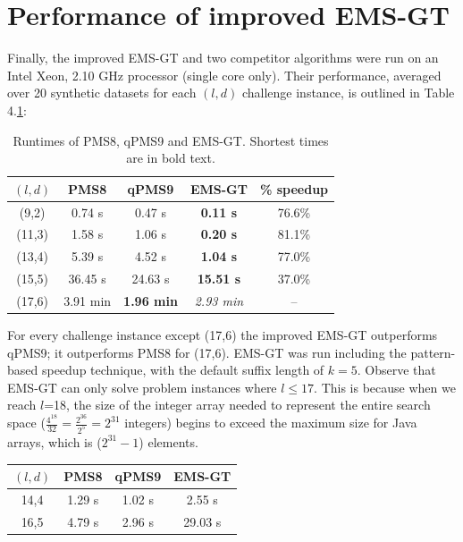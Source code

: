 \documentclass[oneside,12pt]{DISCSthesis}
\begin{document}
{	\section{Performance of improved EMS-GT}
		Finally, the improved EMS-GT and two competitor algorithms were run on an Intel Xeon, 2.10 GHz processor (single core only). Their performance, averaged over 20 synthetic datasets for each $(l,d)$ challenge instance, is outlined in Table 4.\ref{tbl:runtimes_v_pms}:\newline

		\begin{table}[ht] %
			\small
			\renewcommand{\arraystretch}{1.3}
			\label{tbl:runtimes_v_pms}
			\centering
			\begin{tabular}{|c|c|c|c|c|}
			\hline \bfseries\boldmath $(l,d)$ & \bfseries PMS8 & \bfseries qPMS9 & \bfseries EMS-GT & \bfseries \% speedup\\
			\hline
			 (9,2) &  0.74 s  &  0.47 s & {\bf 0.11 s} & 76.6\%\\
			(11,3) &  1.58 s  &  1.06 s & {\bf 0.20 s} & 81.1\%\\
			(13,4) &  5.39 s  &  4.52 s & {\bf 1.04 s} & 77.0\%\\
			(15,5) & 36.45 s  & 24.63 s & {\bf15.51 s} & 37.0\%\\
			(17,6) &  3.91 min & \textbf{1.96 min} & {\emph{2.93 min}} & --\\
			\hline\end{tabular}

			\caption{\small Runtimes of PMS8, qPMS9 and EMS-GT. Shortest times are in bold text.}
			\end{table}

		For every challenge instance except (17,6) the improved EMS-GT outperforms qPMS9; it outperforms PMS8 for (17,6). EMS-GT was run including the pattern-based speedup technique, with the default suffix length of $k=5$. Observe that EMS-GT can only solve problem instances where $l \leq 17$. This is because when we reach $l$=18, the size of the integer array needed to represent the entire search space ($\frac{4^{18}}{32} = \frac{2^{36}}{2^{5}} = 2^{31}$ integers) begins to exceed the maximum size for Java arrays, which is ($2^{31} - 1$) elements.\newline

		\begin{table}[ht] %
			\small
			\renewcommand{\arraystretch}{1.3}
			\label{tbl:runtimes_nonchallenge}
			\centering
			\begin{tabular}{|c|c|c|c|}
			\hline \bfseries\boldmath $(l,d)$ & \bfseries PMS8 & \bfseries qPMS9 & \bfseries EMS-GT \\
			\hline
			14,4 &  1.29 s  &  1.02 s &      2.55 s\\
			16,5 &  4.79 s  &  2.96 s &     29.03 s\\
			\hline\end{tabular}


\end{table}}
\end{document}
